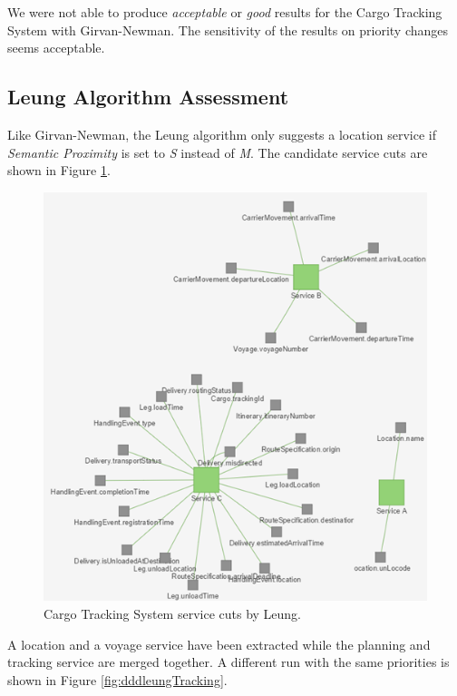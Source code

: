 We were not able to produce \textit{acceptable} or \textit{good} results for the Cargo Tracking System with Girvan-Newman. The sensitivity of the results on priority changes seems acceptable. 

\subsection{Leung Algorithm Assessment}

Like Girvan-Newman, the Leung algorithm only suggests a location service if \textit{Semantic Proximity} is set to \textit{S} instead of \textit{M}. The candidate service cuts are shown in Figure \ref{fig:dddleungVoyage}.	

\begin{figure}[H]
	\includegraphics[scale=0.9]{images/leung_voyage.png}
	\caption{Cargo Tracking System service cuts by Leung.}
	\label{fig:dddleungVoyage}
\end{figure}

A location and a voyage service have been extracted while the planning and tracking service are merged together. A different run with the same priorities is shown in Figure \ref{fig:dddleungTracking}.


